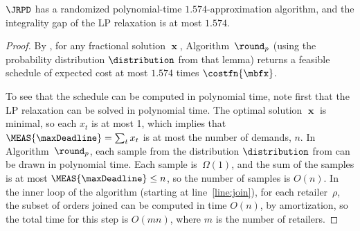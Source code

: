 \begin{theorem}\label{thm: upper bounds}
  $\JRPD$ has a randomized polynomial-time $1.574$-approximation algorithm,
  and the integrality gap of the LP relaxation is at most $1.574$.
\end{theorem}

\begin{proof}
  By ,
  for any fractional solution $\mbfx$, Algorithm~$\round_p$
  (using the probability distribution $\distribution$ from that lemma)
  returns a feasible schedule of expected cost at most $1.574$ 
  times $\costfn{\mbfx}$.  

  To see that the schedule can be computed in polynomial time,
  note first that the LP relaxation can be solved in polynomial time.
  The optimal solution $\mbfx$ is minimal,
  so each $x_t$ is at most 1, which implies that $\MEAS{\maxDeadline} = \sum_{t} x_t$ 
  is at most the number of demands, $n$.
  In Algorithm~$\round_p$,
  each sample from the distribution $\distribution$ from 
  can be drawn in polynomial time.
  Each sample is~$\Omega(1)$, and the sum of the samples 
  is at most $\MEAS{\maxDeadline} \le n$,
  so the number of samples is $O(n)$.
  In the inner loop of the algorithm
  (starting at line~\ref{line:join}),
  for each retailer~$\rho$, the subset of orders joined
  can be computed in time $O(n)$, by amortization, so the total time for
  this step is $O(mn)$, where $m$ is the number of retailers.
\end{proof}


